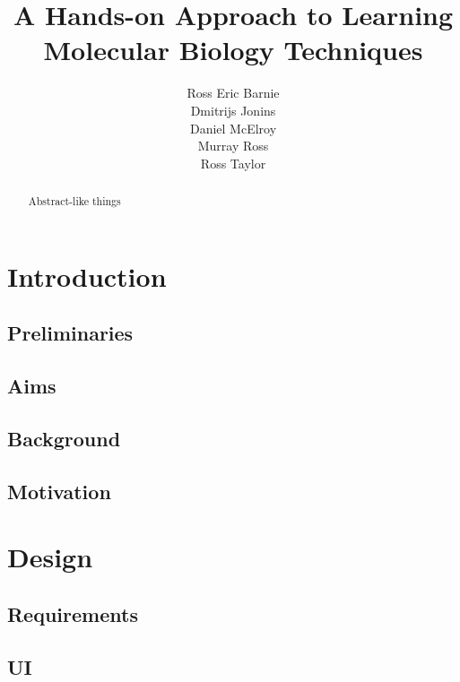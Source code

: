 \documentclass{l3proj}
\title{A Hands-on Approach to Learning Molecular Biology Techniques}
\author{
  Ross Eric Barnie \\
  Dmitrijs Jonins \\
  Daniel McElroy \\
  Murray Ross \\
  Ross Taylor
}
\date{}
\begin{document}
\maketitle
\begin{abstract}

Abstract-like things

\end{abstract}
\educationalconsent
\tableofcontents

\chapter{Introduction}
\label{intro}

\section{Preliminaries}
\label{intro:prelims}


\section{Aims}
\label{intro:aims}


\section{Background}
\label{intro:background}

\section{Motivation}
\label{intro:motiv}


\chapter{Design}
\label{design}

\section{Requirements}
\label{design:reqs}

\section{UI}
\label{design:ui}

\end{document}
